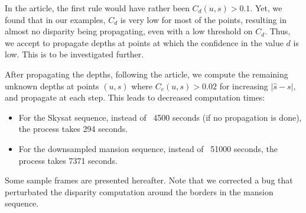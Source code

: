\documentclass{article}
\newcommand{\abs} [1] {\left| #1 \right|}
\theoremstyle{definition}
\begin{document}
In the article, the first rule would have rather been $C_d(u, s) > 0.1$. Yet, we found that in our examples, $C_d$ is very low for most of the points, resulting in almost no disparity being propagating, even with a low threshold on $C_d$. Thus, we accept to propagate depths at points at which the confidence in the value $d$ is low. This is to be investigated further.


After propagating the depths, following the article, we compute the remaining unknown depths at points $(u, s)$ where $C_e(u, s) > 0.02$ for increasing $\abs{\widehat{s} - s}$, and propagate at each step. This leads to decreased computation times:
\begin{itemize}
 \item For the Skysat sequence, instead of ~4500 seconds (if no propagation is done), the process takes 294 seconds.
 \item For the downsampled mansion sequence, instead of ~51000 seconds, the process takes 7371 seconds.
\end{itemize}


Some sample frames are presented hereafter. Note that we corrected a bug that perturbated the disparity computation around the borders in the mansion sequence.
\end{document}
